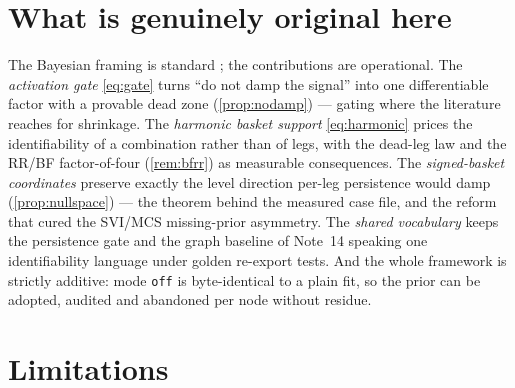 \documentclass[11pt]{article}
\begin{document}
\section{What is genuinely original here}
\label{sec:original}

The Bayesian framing is standard \cite{Gelman2013}; the contributions
are operational.  The \emph{activation gate} \eqref{eq:gate} turns
``do not damp the signal'' into one differentiable factor with a
provable dead zone (\cref{prop:nodamp}) --- gating where the
literature reaches for shrinkage.  The \emph{harmonic basket support}
\eqref{eq:harmonic} prices the identifiability of a combination
rather than of legs, with the dead-leg law and the RR/BF
factor-of-four (\cref{rem:bfrr}) as measurable consequences.  The
\emph{signed-basket coordinates} preserve exactly the level direction
per-leg persistence would damp (\cref{prop:nullspace}) --- the theorem
behind the measured case file, and the reform that cured the SVI/MCS
missing-prior asymmetry.  The \emph{shared vocabulary} keeps the
persistence gate and the graph baseline of Note~14 speaking one
identifiability language under golden re-export tests.  And the whole
framework is strictly additive: mode \texttt{off} is byte-identical
to a plain fit, so the prior can be adopted, audited and abandoned
per node without residue.

\section{Limitations}
\label{sec:limits}
\end{document}

